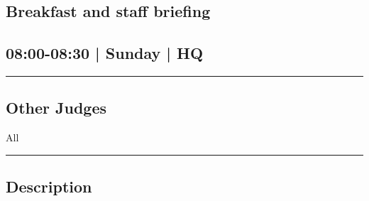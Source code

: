 \documentclass[10pt, A5]{article}
\begin{document}
		\begin{framed}
			\begin{minipage}{\textwidth}

			\setcounter{section}{91}
							\section{Breakfast and staff briefing}
						
			\subsection*{08:00-08:30 | Sunday | HQ}

			\vspace{0.25cm}
			\hrule
			\vspace{0.25cm}


			\subsection*{Other Judges}
							All

					\vspace{0.25cm}
			\hrule
			\vspace{0.25cm}

			\begin{minipage}{\textwidth}
			\subsection*{\faListAlt \: Description}
			
			\end{minipage}


	\end{minipage}
	\end{framed}

	
\end{document}
